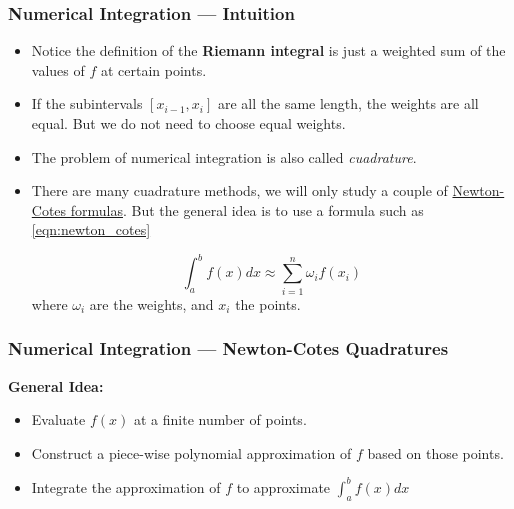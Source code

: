 \documentclass[11pt,xcolor={svgnames},aspectratio=169,usepdftitle=false]{beamer}
\begin{document}
\begin{frame}
  \frametitle{Numerical Integration --- Intuition}
\begin{itemize}
  \item Notice the definition of the \alert{\textbf{Riemann integral}} is just a weighted sum of the values of $f$ at certain points.
  \item If the subintervals $[x_{i-1},x_i]$ are all the same length, the weights are all equal. But we do not need to choose equal weights.
  \item The problem of numerical integration is also called \textit{cuadrature}.
  \item There are many cuadrature methods, we will only study a couple of \href{https://en.wikipedia.org/wiki/Newton-Cotes_formulas}{Newton-Cotes formulas}. But the general idea is to use a formula such as \eqref{eqn:newton_cotes}
  
  \begin{equation}
  \int^b_a f(x) dx \approx \sum^n_{i=1}\omega_i f(x_i)
  \label{eqn:newton_cotes}
  \end{equation}
  where $\omega_i$ are the weights, and $x_i$ the points.
\end{itemize}
\end{frame}

\begin{frame}
  \frametitle{Numerical Integration --- Newton-Cotes Quadratures}
  \alert{\textbf{General Idea:}}
\begin{itemize}
  \item Evaluate $f(x)$ at a finite number of points.
  \item Construct a piece-wise polynomial approximation of $f$ based on those points.
  \item Integrate the approximation of $f$ to approximate $\int^b_a f(x)dx$
\end{itemize}
\end{frame}
\end{document}
